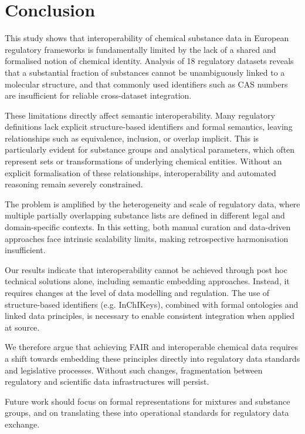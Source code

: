 \section{Conclusion}
\label{sec:conclusion}

This study shows that interoperability of chemical substance data in European regulatory frameworks is fundamentally limited by the lack of a shared and formalised notion of chemical identity. Analysis of 18 regulatory datasets reveals that a substantial fraction of substances cannot be unambiguously linked to a molecular structure, and that commonly used identifiers such as CAS numbers are insufficient for reliable cross-dataset integration.

These limitations directly affect semantic interoperability. Many regulatory definitions lack explicit structure-based identifiers and formal semantics, leaving relationships such as equivalence, inclusion, or overlap implicit. This is particularly evident for substance groups and analytical parameters, which often represent sets or transformations of underlying chemical entities. Without an explicit formalisation of these relationships, interoperability and automated reasoning remain severely constrained.

The problem is amplified by the heterogeneity and scale of regulatory data, where multiple partially overlapping substance lists are defined in different legal and domain-specific contexts. In this setting, both manual curation and data-driven approaches face intrinsic scalability limits, making retrospective harmonisation insufficient.

Our results indicate that interoperability cannot be achieved through post hoc technical solutions alone, including semantic embedding approaches. Instead, it requires changes at the level of data modelling and regulation. The use of structure-based identifiers (e.g. InChIKeys), combined with formal ontologies and linked data principles, is necessary to enable consistent integration when applied at source.

We therefore argue that achieving FAIR and interoperable chemical data requires a shift towards embedding these principles directly into regulatory data standards and legislative processes. Without such changes, fragmentation between regulatory and scientific data infrastructures will persist.

Future work should focus on formal representations for mixtures and substance groups, and on translating these into operational standards for regulatory data exchange.